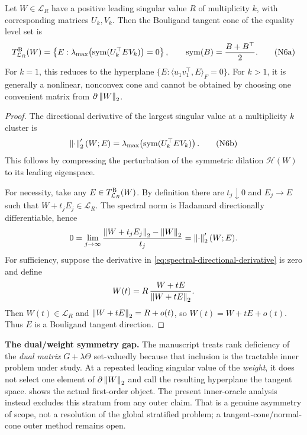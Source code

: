 \begin{proposition}
\label{prop:repeated-top-tangent-cone}
Let \(W\in\mathcal L_R\) have a positive leading singular value \(R\) of
multiplicity \(k\), with corresponding matrices \(U_k,V_k\).  Then the
Bouligand tangent cone of the equality level set is
\begin{equation}
 T_{\mathcal L_R}^{\rm B}(W)
 =
 \left\{
 E:
 \lambda_{\max}\!\left(
 \operatorname{sym}(U_k^\top E V_k)
 \right)=0
 \right\},
\qquad
\operatorname{sym}(B)=\frac{B+B^\top}{2}.
\tag{N6a}
\label{eq:repeated-top-tangent-cone}
\end{equation}
For \(k=1\), this reduces to the hyperplane
\(\{E:\langle u_1v_1^\top,E\rangle_F=0\}\).  For \(k>1\), it is generally a
nonlinear, nonconvex cone and cannot be obtained by choosing one convenient
matrix from \(\partial\left\lVert W\right\rVert_{2}\).
\end{proposition}

\begin{proof}
The directional derivative of the largest singular value at a multiplicity
\(k\) cluster is
\begin{equation}
 \left\lVert \cdot\right\rVert_{2}'(W;E)
 =
 \lambda_{\max}\!\left(
 \operatorname{sym}(U_k^\top E V_k)
 \right).
\tag{N6b}
\label{eq:spectral-directional-derivative}
\end{equation}
This follows by compressing the perturbation of the symmetric dilation
\(\mathcal H(W)\) to its leading eigenspace.

For necessity, take any \(E\in T_{\mathcal L_R}^{\rm B}(W)\).  By definition
there are \(t_j\downarrow0\) and \(E_j\to E\) such that
\(W+t_jE_j\in\mathcal L_R\).  The spectral norm is Hadamard directionally
differentiable, hence
\[
 0
 =
 \lim_{j\to\infty}
 \frac{\left\lVert W+t_jE_j\right\rVert_{2}-\left\lVert W\right\rVert_{2}}{t_j}
 =
 \left\lVert \cdot\right\rVert_{2}'(W;E).
\]
For sufficiency, suppose the derivative in
\eqref{eq:spectral-directional-derivative} is zero and define
\[
 W(t)=R\,\frac{W+tE}{\left\lVert W+tE\right\rVert_{2}}.
\]
Then \(W(t)\in\mathcal L_R\) and
\(\left\lVert W+tE\right\rVert_{2}=R+o(t)\), so
\(W(t)=W+tE+o(t)\).  Thus \(E\) is a Bouligand tangent direction.
\end{proof}

\begin{boundary}
\textbf{The dual/weight symmetry gap.}
The manuscript treats rank deficiency of the \emph{dual matrix}
\(G+\lambda\Theta\) set-valuedly because that inclusion is the tractable inner
problem under study.  At a repeated leading singular value of the
\emph{weight}, it does not select one element of
\(\partial\left\lVert W\right\rVert_{2}\) and call the resulting hyperplane the tangent space.
 shows the actual first-order object.
The present inner-oracle analysis instead excludes this stratum from any
outer claim.  That is a genuine asymmetry of scope, not a resolution of the
global stratified problem; a tangent-cone/normal-cone outer method remains
open.
\end{boundary}

